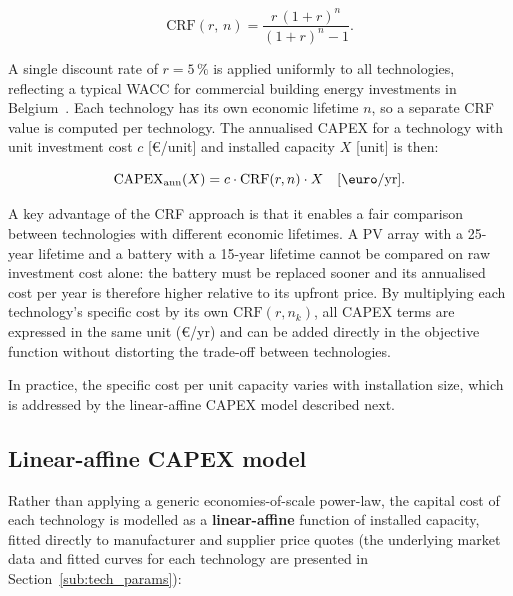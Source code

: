 \documentclass[11pt,a4paper]{report}
\begin{document}
\begin{equation}
    \mathrm{CRF}(r,\,n) = \frac{r\,(1+r)^{n}}{(1+r)^{n}-1}.
    \label{eq:crf}
\end{equation}

\noindent A single discount rate of $r = 5\,\%$ is applied uniformly to all technologies,
reflecting a typical WACC for commercial building energy investments in Belgium~\cite{VEKA2026}.
Each technology has its own economic lifetime $n$, so a separate CRF value is computed per
technology.
The annualised CAPEX for a technology with unit investment cost $c$ [\euro/unit] and
installed capacity $X$ [unit] is then:

\begin{equation}
    \mathrm{CAPEX}_\mathrm{ann}(X) = c \cdot \mathrm{CRF}(r,n) \cdot X
    \quad [\text{\euro/yr}].
    \label{eq:capex_ann_linear}
\end{equation}

\noindent A key advantage of the CRF approach is that it enables a fair comparison between technologies with different economic lifetimes.
A PV array with a 25-year lifetime and a battery with a 15-year lifetime cannot be compared on raw investment cost alone: the battery must be replaced sooner and its annualised cost per year is therefore higher relative to its upfront price.
By multiplying each technology's specific cost by its own $\mathrm{CRF}(r, n_k)$, all CAPEX terms are expressed in the same unit (\euro/yr) and can be added directly in the objective function without distorting the trade-off between technologies.

\noindent In practice, the specific cost per unit capacity varies with installation size, which is addressed by the linear-affine CAPEX model described next.

\subsection{Linear-affine CAPEX model}
\label{sub:capex_model}

Rather than applying a generic economies-of-scale power-law, the capital cost of each
technology is modelled as a \textbf{linear-affine} function of installed capacity,
fitted directly to manufacturer and supplier price quotes (the underlying market data and fitted curves for each technology are presented in Section~\ref{sub:tech_params}):
\end{document}
